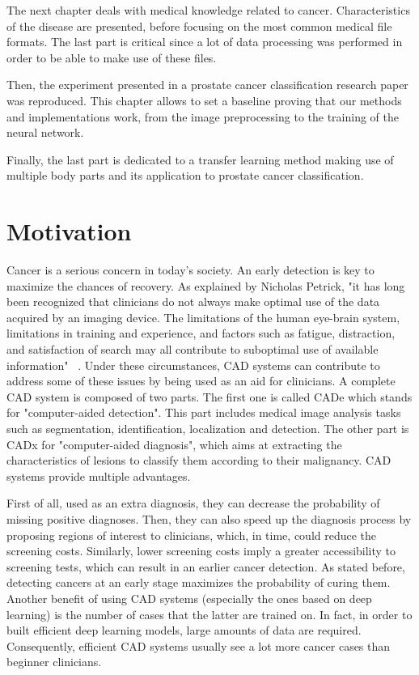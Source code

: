 The next chapter deals with medical knowledge related to cancer. Characteristics of the disease are presented, before focusing on the most common medical file formats. The last part is critical since a lot of data processing was performed in order to be able to make use of these files.

Then, the experiment presented in a prostate cancer classification research paper was reproduced. This chapter allows to set a baseline proving that our methods and implementations work, from the image preprocessing to the training of the neural network.

Finally, the last part is dedicated to a transfer learning method making use of multiple body parts and its application to prostate cancer classification.



\section{Motivation}
\setlength{\marginparwidth}{3cm}\leavevmode {}Cancer is a serious concern in today's society. An early detection is key to maximize the chances of recovery. As explained by Nicholas Petrick, "it has long been recognized that clinicians do not always make optimal use of the data acquired by an imaging device. The limitations of the human eye-brain system, limitations in training and experience, and factors such as fatigue, distraction, and satisfaction of search may all contribute to suboptimal use of available information" ~\cite{50}. Under these circumstances, CAD systems can contribute to address some of these issues by being used as an aid for clinicians. A complete CAD system is composed of two parts. The first one is called CADe which stands for "computer-aided detection". This part includes medical  image  analysis  tasks  such  as  segmentation,  identification,  localization  and  detection. The other part is CADx for "computer-aided diagnosis", which aims at extracting the characteristics of lesions to classify them according to their malignancy. CAD systems provide multiple advantages.

First of all, used as an extra diagnosis, they can decrease the probability of missing positive diagnoses. Then, they can also speed up the diagnosis process by proposing regions of interest to clinicians, which, in time, could reduce the screening costs. Similarly, lower screening costs imply a greater accessibility to screening tests, which can result in an earlier cancer detection. As stated before, detecting cancers at an early stage maximizes the probability of curing them. Another benefit of using CAD systems (especially the ones based on deep learning) is the number of cases that the latter are trained on. In fact, in order to built efficient deep learning models, large amounts of data are required. Consequently, efficient CAD systems usually see a lot more cancer cases than beginner clinicians.


